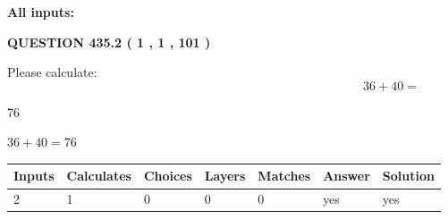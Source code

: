 \documentclass[12pt]{article}
\begin{document}
   
   
   
\noindent{}
   
   
   
   
\noindent\vspace{0.1in}\hspace{-0.08in} {\textbf{\Large{All inputs: }}}
   
   
  
\vspace{0.2in}
  
{\textbf{\Large{QUESTION
435.2 
 ( 1 , 1 , 101 )
}}}
  
  
 
Please calculate:
\begin{equation}
36 +  %
40 = \nonumber
\end{equation}
 
 
 
\noindent{}
 
 

76
 
 
\noindent{}
 
 

 
 
 
\noindent{}
 
 

$ %
36 +  %
40=   %
76$
 
 
\noindent{}
 
 

 
   
   
   
   
\noindent\begin{tabular}{|l|l|l|l|l|l|l|}
 \hline
Inputs & Calculates & Choices & Layers & Matches & Answer & Solution \\ \hline
 2  & 
 1  & 
 0
  & 
 0  & 
 0  & 
  yes & 
  yes 
  \\ \hline
 \end{tabular}
   
   
   
   
\noindent{}
   
\end{document}
